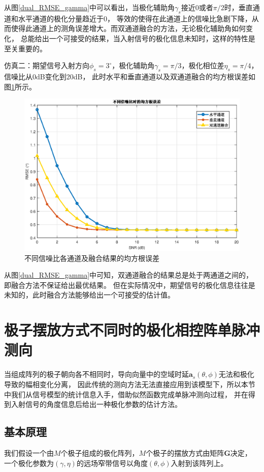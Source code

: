 \documentclass[master]{thesis-uestc}
\begin{document}
从图\ref{dual_RMSE_gamma}中可以看出，当极化辅助角$\gamma_s$接近$0$或者$\pi/2$时，垂直通道和水平通道的极化分量趋近于0，
等效的使得在此通道上的信噪比急剧下降，从而使得此通道上的测角误差增大。而双通道融合的方法，无论极化辅助角如何变化，
总能给出一个可接受的结果，当入射信号的极化信息未知时，这样的特性是至关重要的。

仿真二：期望信号入射方向$\phi_s=3^\circ$，极化辅助角$\gamma_s=\pi/3$，极化相位差$\eta_s=\pi/4$，信噪比从0dB变化到20dB，
此时水平和垂直通道以及双通道融合的均方根误差如图\ref{dual_RMSE_SNR}所示。
\begin{figure}[H]
    \includegraphics[scale=0.5]{pic/dual_RMSE_SNR.eps}
    \caption{不同信噪比各通道及融合结果的均方根误差}
    \label{dual_RMSE_SNR}
\end{figure}

从图\ref{dual_RMSE_gamma}中可知，双通道融合的结果总是处于两通道之间的，即融合方法不保证给出最优结果。
但在实际情况中，期望信号的极化信息往往是未知的，此时融合方法能够给出一个可接受的估计值。

\section{极子摆放方式不同时的极化相控阵单脉冲测向}
当组成阵列的极子朝向各不相同时，导向向量中的空域时延$\bm{a}_s(\theta,\phi)$无法和极化导致的幅相变化分离，
因此传统的测向方法无法直接应用到该模型下，所以本节中我们从信号模型的统计信息入手，借助似然函数完成单脉冲测向过程，
并在得到入射信号的角度信息后给出一种极化参数的估计方法。

\subsection{基本原理}
我们假设一个由$M$个极子组成的极化阵列，$M$个极子的摆放方式由矩阵$\bm{G}$决定，
一个极化参数为$(\gamma,\eta)$的远场窄带信号以角度$(\theta,\phi)$入射到该阵列上。
\end{document}

